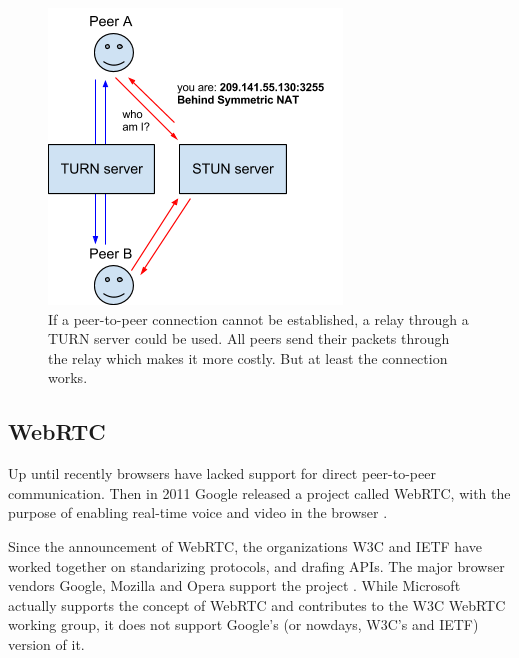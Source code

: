\begin{figure}[htp]
\centering
\includegraphics[width=\textwidth,height=0.2\paperheight,keepaspectratio
]{figures/webrtc-turn}
\caption{If a peer-to-peer connection cannot be established, a relay through a TURN server could be used. All peers send their packets through the relay which makes it more costly. But at least the connection works\cite{WebRTCArchitecture:2014:Online}.}
\label{fig:WebRTC - TURN}
\end{figure}

\subsection{WebRTC}

Up until recently browsers have lacked support for direct peer-to-peer communication. Then in 2011 Google released a project called WebRTC, with the purpose of enabling real-time voice and video in the browser \cite{WebRTCMemo:Online}.

Since the announcement of WebRTC, the organizations W3C and IETF have worked together on standarizing protocols, and drafing APIs. The major browser vendors Google, Mozilla and Opera support the project \cite{WebRTCAndMicrosoft:2012:Online}. While Microsoft actually supports the concept of WebRTC and contributes to the W3C WebRTC working group, it does not support Google’s (or nowdays, W3C’s and IETF) version of it\cite{WebRTCAndMicrosoft:2012:Online}.

